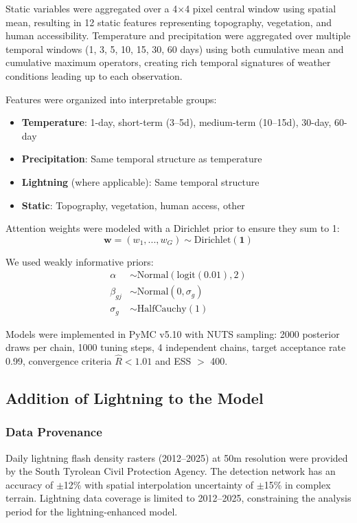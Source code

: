 \documentclass[11pt,a4paper]{article}
\begin{document}
Static variables were aggregated over a 4×4 pixel central window using spatial mean, resulting in 12 static features representing topography, vegetation, and human accessibility. Temperature and precipitation were aggregated over multiple temporal windows (1, 3, 5, 10, 15, 30, 60 days) using both cumulative mean and cumulative maximum operators, creating rich temporal signatures of weather conditions leading up to each observation.

Features were organized into interpretable groups:
\begin{itemize}
    \item \textbf{Temperature}: 1-day, short-term (3--5d), medium-term (10--15d), 30-day, 60-day
    \item \textbf{Precipitation}: Same temporal structure as temperature
    \item \textbf{Lightning} (where applicable): Same temporal structure
    \item \textbf{Static}: Topography, vegetation, human access, other
\end{itemize}

Attention weights were modeled with a Dirichlet prior to ensure they sum to 1:
\begin{equation}
\mathbf{w} = (w_1, ..., w_G) \sim \text{Dirichlet}(\mathbf{1})
\end{equation}

We used weakly informative priors:
\begin{align}
\alpha &\sim \text{Normal}(\text{logit}(0.01), 2) \\
\beta_{gj} &\sim \text{Normal}(0, \sigma_g) \\
\sigma_g &\sim \text{HalfCauchy}(1)
\end{align}

Models were implemented in PyMC v5.10 with NUTS sampling: 2000 posterior draws per chain, 1000 tuning steps, 4 independent chains, target acceptance rate 0.99, convergence criteria $\hat{R} < 1.01$ and ESS $>$ 400.

\subsection{Addition of Lightning to the Model}

\subsubsection{Data Provenance}

Daily lightning flash density rasters (2012--2025) at 50m resolution were provided by the South Tyrolean Civil Protection Agency. The detection network has an accuracy of $\pm$12\% with spatial interpolation uncertainty of $\pm$15\% in complex terrain. Lightning data coverage is limited to 2012--2025, constraining the analysis period for the lightning-enhanced model.
\end{document}
